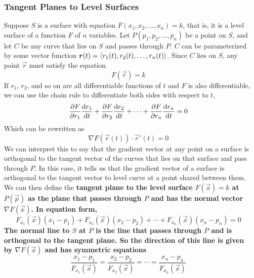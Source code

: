 \subsubsection{Tangent Planes to Level Surfaces}
Suppose \(S\) is a surface with equation \(F(x_1, x_2, \dots, x_n)=k\), that is, it is a level surface of a function \(F\) of \(n\) variables. Let \(P(p_1, p_2, \dots, p_n)\) be a point on \(S\), and let \(C\) be any curve that lies on \(S\) and passes through \(P\). \(C\) can be parameterized by some vector function \(\boldsymbol{r}(t) = \left\langle r_1(t), r_2(t), \dots, r_n(t)\right\rangle\). Since \(C\) lies on \(S\), any point \(\vec r\) must satisfy the equation 
\[ F(\vec r) = k \]
If \(r_1\), \(r_2\), and so on are all differentiable functions of \(t\) and \(F\) is also differentiable, we can use the chain rule to differentiate both sides with respect to \(t\), 
\[ \pdv{F}{r_1}\dv{r_1}{t} + \pdv{F}{r_2}\dv{r_2}{t} + \dots + \pdv{F}{r_n}\dv{r_n}{t} = 0 \]
Which can be rewritten as
\[ \nabla F(\vec r(t)) \cdot \vec r'(t) = 0 \]
We can interpret this to say that the gradient vector at any point on a surface is orthogonal to the tangent vector of the curves that lies on that surface and pass through \(P\). In this case, it tells us that the gradient vector of a surface is orthogonal to the tangent vector to level curve at a point shared between them. We can then define the \bf{tangent plane to the level surface \(F(\vec x)=k\) at \(P(\vec p)\)} as the plane that passes through \(P\) and has the normal vector \(\nabla F(\vec x)\). In equation form,
\[ F_{x_1}(\vec x)(x_1 - p_1) + F_{x_2}(\vec x)(x_2 - p_2) + \cdots + F_{x_n}(\vec x)(x_n - p_n) = 0\]
The \bf{normal line} to \(S\) at \(P\) is the line that passes through \(P\) and is orthogonal to the tangent plane. So the direction of this line is given by \(\nabla F(\vec x)\) and has symmetric equations
\[ \frac{x_1 - p_1}{F_{x_1}(\vec x)} = \frac{x_2 - p_2}{F_{x_2}(\vec x)} = \cdots = \frac{x_n - p_n}{F_{x_n}(\vec x)} \]
